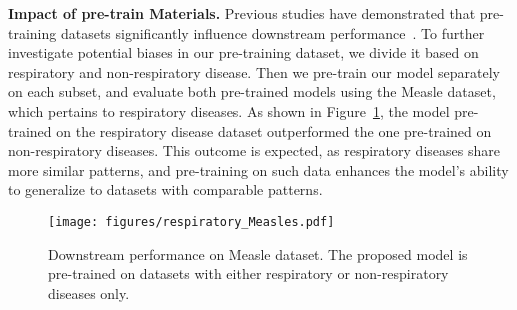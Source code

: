     


\textbf{Impact of pre-train Materials.}
Previous studies have demonstrated that pre-training datasets significantly influence downstream performance~\cite{}. To further investigate potential biases in our pre-training dataset, we divide it based on respiratory and non-respiratory disease. Then we pre-train our model separately on each subset, and evaluate both pre-trained models using the Measle dataset, which pertains to respiratory diseases. As shown in Figure~\ref{fig: respiratory}, the model pre-trained on the respiratory disease dataset outperformed the one pre-trained on non-respiratory diseases. This outcome is expected, as respiratory diseases share more similar patterns, and pre-training on such data enhances the model's ability to generalize to datasets with comparable patterns.



\begin{figure}[htbp]
    \centering
    \texttt{[image: figures/respiratory\_Measles.pdf]}
    \caption{Downstream performance on Measle dataset. The proposed model is pre-trained on datasets with either respiratory or non-respiratory diseases only.}
    
    \label{fig: respiratory}
\end{figure} 




